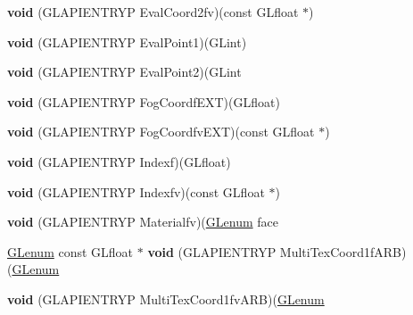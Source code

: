 \begin{DoxyCompactItemize}
{\bfseries void} (G\+L\+A\+P\+I\+E\+N\+T\+R\+YP Eval\+Coord2fv)(const G\+Lfloat $\ast$)
\item 
\mbox{\label{struct_g_lvertexformat_a5e13093a9f8bd8864f7171eb46a1d17d}} 
{\bfseries void} (G\+L\+A\+P\+I\+E\+N\+T\+R\+YP Eval\+Point1)(G\+Lint)
\item 
\mbox{\label{struct_g_lvertexformat_a30677f72f9e3bdb78f05e99d72b6f723}} 
{\bfseries void} (G\+L\+A\+P\+I\+E\+N\+T\+R\+YP Eval\+Point2)(G\+Lint
\item 
\mbox{\label{struct_g_lvertexformat_a122b56658c05c32bc25f7631cf4876e0}} 
{\bfseries void} (G\+L\+A\+P\+I\+E\+N\+T\+R\+YP Fog\+Coordf\+E\+XT)(G\+Lfloat)
\item 
\mbox{\label{struct_g_lvertexformat_a2e9d1c3c80e630706925664578cca95a}} 
{\bfseries void} (G\+L\+A\+P\+I\+E\+N\+T\+R\+YP Fog\+Coordfv\+E\+XT)(const G\+Lfloat $\ast$)
\item 
\mbox{\label{struct_g_lvertexformat_aa6eeacefb37043ccb290d0f33737ecdb}} 
{\bfseries void} (G\+L\+A\+P\+I\+E\+N\+T\+R\+YP Indexf)(G\+Lfloat)
\item 
\mbox{\label{struct_g_lvertexformat_ae84a75c83017e26ceb9d390e6344c54f}} 
{\bfseries void} (G\+L\+A\+P\+I\+E\+N\+T\+R\+YP Indexfv)(const G\+Lfloat $\ast$)
\item 
\mbox{\label{struct_g_lvertexformat_a128b53837f4735afa7cb5da9033e1c33}} 
{\bfseries void} (G\+L\+A\+P\+I\+E\+N\+T\+R\+YP Materialfv)(\hyperlink{interfacevoid}{G\+Lenum} face
\item 
\mbox{\label{struct_g_lvertexformat_a435663c8a50feb4bd0d20dab519100dc}} 
\hyperlink{interfacevoid}{G\+Lenum} const G\+Lfloat $\ast$ {\bfseries void} (G\+L\+A\+P\+I\+E\+N\+T\+R\+YP Multi\+Tex\+Coord1f\+A\+RB)(\hyperlink{interfacevoid}{G\+Lenum}
\item 
\mbox{\label{struct_g_lvertexformat_a9ce47a3ec914287904207380c9c1072e}} 
{\bfseries void} (G\+L\+A\+P\+I\+E\+N\+T\+R\+YP Multi\+Tex\+Coord1fv\+A\+RB)(\hyperlink{interfacevoid}{G\+Lenum}

\end{DoxyCompactItemize}
